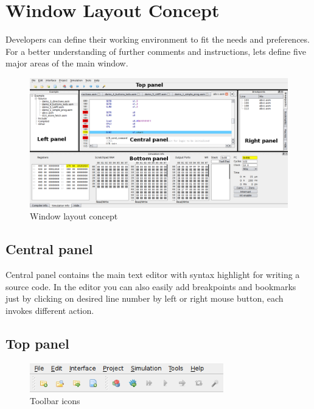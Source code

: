 \section{Window Layout Concept}
    Developers can define their working environment to fit the needs and preferences. For a better understanding of
    further comments and instructions, lets define five major areas of the main window.

   \begin{figure}[h]
        \centering
        \includegraphics[width=\textwidth]{img/Main_window.png}
        \caption{Window layout concept}
    \end{figure}

\subsection{Central panel}
    Central panel contains the main text editor with syntax highlight for writing a source code. In the editor you can
    also easily add breakpoints and bookmarks just by clicking on desired line number by left or right mouse button,
    each invokes different action.

\subsection{Top panel}
   \begin{figure}[h!]
        \centering
        \includegraphics[width=0.75\textwidth]{img/top_panel.png}
        \caption{Toolbar icons}
    \end{figure}

